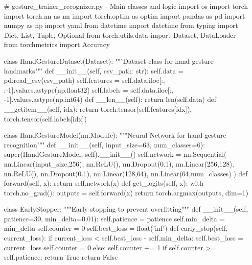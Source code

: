 \begin{aivncodebox}
\begin{python}
# gesture_trainer_recognizer.py - Main classes and logic
import os
import torch
import torch.nn as nn
import torch.optim as optim
import pandas as pd
import numpy as np
import yaml
from datetime import datetime
from typing import Dict, List, Tuple, Optional
from torch.utils.data import Dataset, DataLoader
from torchmetrics import Accuracy

class HandGestureDataset(Dataset):
    """Dataset class for hand gesture landmarks"""
    def __init__(self, csv_path: str):
        self.data = pd.read_csv(csv_path)
        self.features = self.data.iloc[:, :-1].values.astype(np.float32)
        self.labels = self.data.iloc[:, -1].values.astype(np.int64)
    def __len__(self):
        return len(self.data)
    def __getitem__(self, idx):
        return torch.tensor(self.features[idx]), torch.tensor(self.labels[idx])

class HandGestureModel(nn.Module):
    """Neural Network for hand gesture recognition"""
    def __init__(self, input_size=63, num_classes=6):
        super(HandGestureModel, self).__init__()
        self.network = nn.Sequential(
            nn.Linear(input_size,256),
            nn.ReLU(),
            nn.Dropout(0.1),
            nn.Linear(256,128),
            nn.ReLU(),
            nn.Dropout(0.1),
            nn.Linear(128,64),
            nn.Linear(64,num_classes)
        )
    def forward(self, x):
        return self.network(x)
    def get_logits(self, x):
        with torch.no_grad():
            outputs = self.forward(x)
            return torch.argmax(outputs, dim=1)

class EarlyStopper:
    """Early stopping to prevent overfitting"""
    def __init__(self, patience=30, min_delta=0.01):
        self.patience = patience
        self.min_delta = min_delta
        self.counter = 0
        self.best_loss = float('inf')
    def early_stop(self, current_loss):
        if current_loss < self.best_loss - self.min_delta:
            self.best_loss = current_loss
            self.counter = 0
        else:
            self.counter += 1
            if self.counter >= self.patience:
                return True
        return False


\end{python}
\end{aivncodebox}
